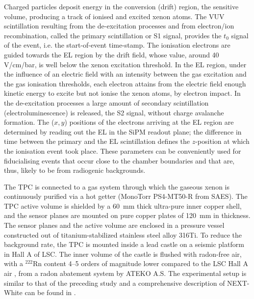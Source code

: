 \documentclass[%
 reprint,
superscriptaddress,
 amsmath,amssymb,
 aps,
]{revtex4-2}
\begin{document}
Charged particles deposit energy in the conversion (drift) region, the sensitive volume, producing a track of ionised and excited xenon atoms. The VUV scintillation resulting from the de-excitation processes and from electron/ion recombination, called the primary scintillation or S1 signal, provides the $t_0$ signal of the event, i.e. the start-of-event time-stamp. The ionisation electrons are guided towards the EL region by the drift field, whose value, around 40 V/cm/bar, is well below the xenon excitation threshold. In the EL region, under the influence of an electric field with an intensity between the gas excitation and the gas ionisation thresholds, each electron attains from the electric field enough kinetic energy to excite but not ionise the xenon atoms, by electron impact. In the de-excitation processes  a large amount of secondary scintillation (electroluminescence) is released, the S2 signal, without charge avalanche formation. The ($x,y$) positions of the electrons arriving at the EL region are determined by reading out the EL in the SiPM readout plane; the difference in time between the primary and the EL scintillation defines the $z$-position at which the ionisation event took place. These parameters can be conveniently used for fiducialising events that occur close to the chamber boundaries and that are, thus, likely to be from radiogenic backgrounds.

The TPC is connected to a gas system through which the gaseous xenon is continuously purified via a hot getter (MonoTorr PS4-MT50-R from SAES). The TPC active volume is shielded by a 60~mm thick ultra-pure inner copper shell, and the sensor planes are mounted on pure copper plates of 120~mm in thickness. The sensor planes and the active volume are enclosed in a pressure vessel constructed out of titanium-stabilized stainless steel alloy 316Ti. To reduce the background rate, the TPC is mounted inside a lead castle on a seismic platform in Hall A of LSC. The inner volume of the castle is flushed with radon-free air, with a $^{222}$Rn content 4–5 orders of magnitude lower compared to the LSC Hall A air \cite{e}, from a radon abatement system by ATEKO A.S. The experimental setup is similar to that of the preceding study \cite{f} and a comprehensive description of NEXT-White can be found in \cite{41}. 
\end{document}

